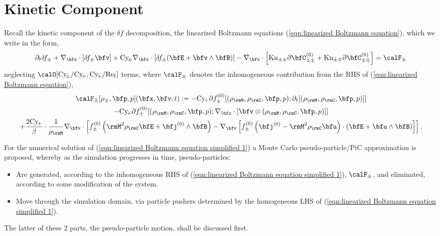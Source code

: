 \chapter{Kinetic Component}\label{cha:kinetic component}
    Recall the kinetic component of the $\delta\!f$ decomposition, the linearized Boltzmann equations (\ref{eqn:linearized Boltzmann equation}), which we write in the form,
    \begin{equation}\label{eqn:linearized Boltzmann equation simplified 1}
        \partial_{t}\delta\!f_{\pm}
        + \nabla_{\bfx}\cdot[\delta\!f_{\pm}\bfv]
        + \rmCy\!_{\pm}\nabla_{\bfv}\cdot[\delta\!f_{\pm}(\bfE + \bfv\wedge\bfB)]
        - \nabla_{\bfv}\cdot\left[\rmKn_{\pm\pm}\partial\bfC_{\pm\pm}^{(0)} + \rmKn_{\pm\mp}\partial\bfC_{\pm\mp}^{(0)}\right]
        =  \calF_{\pm}
    \end{equation}
    neglecting $\calO[\rmCy\!_{\pm}/\rmCy\!_{+}, \rmCy\!_{+}/\rmRef]$ terms, where $\calF_{\pm}$ denotes the inhomogeneous contribution from the RHS of (\ref{eqn:linearized Boltzmann equation}),
    \begin{multline}\label{eqn:inhomogeneous RHS}
        \calF_{\pm}[\rho_{\pm}, \bfp, p](\bfx, \bfv; t)
        :=  - \rmCy\!_{+}\partial f_{\pm}^{(0)}[(\rho_{\rmM}, \rho_{\rmC}, \bfp, p); \partial_{t}[(\rho_{\rmM}, \rho_{\rmC}, \bfp, p)]]  \\
        - \rmCy\!_{+}\partial f_{\pm}^{(0)}[(\rho_{\rmM}, \rho_{\rmC}, \bfp, p); \nabla_{\bfx}\cdot[\bfv\otimes(\rho_{\rmM}, \rho_{\rmC}, \bfp, p)]]  \\
        + \frac{2\rmCy\!_{+}}{\beta}\cdot\frac{1}{\rho_{\rmM}}\nabla_{\bfv}\cdot\left[f_{\pm}^{(0)}\left(\rmM^{2}\rho_{\rmC}\bfE + \bfj^{(0)}\wedge\bfB\right) - \nabla_{\bfv}\left[f_{\pm}^{(0)}\left(\bfj^{(0)} - \rmM^{2}\rho_{\rmC}\bfu\right)\cdot\left(\bfE + \bfu\wedge\bfB\right)\right]\right].
    \end{multline}

    For the numerical solution of (\ref{eqn:linearized Boltzmann equation simplified 1}) a Monte Carlo pseudo-particle/PiC approximation is proposed, whereby as the simulation progresses in time, pseudo-particles:
    \begin{itemize}
        \item  Are generated, according to the inhomogeneous RHS of (\ref{eqn:linearized Boltzmann equation simplified 1}), $\calF_{\pm}$, and eliminated, according to some modification of the system.
        \item  Move through the simulation domain, via particle pushers determined by the homogeneous LHS of (\ref{eqn:linearized Boltzmann equation simplified 1}).
    \end{itemize}
    The latter of these 2 parts, the pseudo-particle motion, shall be discussed first.


    
    
    